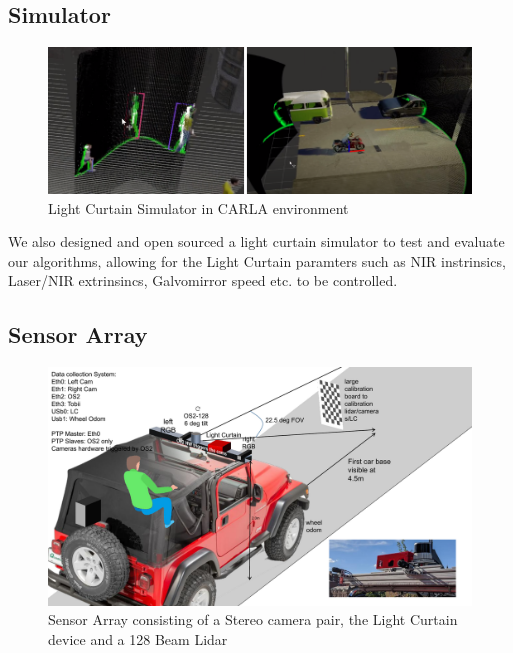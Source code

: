 \documentclass[review]{cvpr}
\begin{document}
\subsection{Simulator}

\begin{figure}[h]
   \centering
   \begin{minipage}{0.5\textwidth}
       \centering
       \includegraphics[width=1.0\textwidth]{figures/sim.png}
   \end{minipage}\hfill
   \centering
   \caption{Light Curtain Simulator in CARLA environment}
\end{figure}

We also designed and open sourced a light curtain simulator to test and evaluate our algorithms, allowing for the Light Curtain paramters such as NIR instrinsics, Laser/NIR extrinsincs, Galvomirror speed etc. to be controlled.

\subsection{Sensor Array}

\begin{figure}[h]
   \centering
   \begin{minipage}{0.5\textwidth}
       \centering
       \includegraphics[width=1.0\textwidth]{figures/array.pdf}
   \end{minipage}\hfill
   \centering
   \caption{Sensor Array consisting of a Stereo camera pair, the Light Curtain device and a 128 Beam Lidar}
\end{figure}
\end{document}
